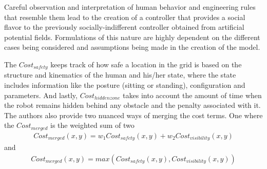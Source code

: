 \par
Careful observation and interpretation of human behavior and engineering rules that resemble them lead to the creation of a controller that provides a social flavor to the previously socially-indifferent controller obtained from artificial potential fields. Formulations of this nature are highly dependent on the different cases being considered and assumptions being made in the creation of the model.

The $Cost_{safety}$ keeps track of how safe a location in the grid is based on the structure and kinematics of the human and his/her state, where the state includes information like the posture (sitting or standing), configuration and parameters.
And lastly, $Cost_{hidden zone}$ takes into account the amount of time when the robot remains hidden behind any obstacle and the penalty associated with it. 
The authors also provide two nuanced ways of merging the cost terms. One where the $Cost_{merged}$ is the weighted sum of two
\begin{align}
Cost_{merged}(x,y) = w_{1}Cost_{safety}(x,y) + w_{2}Cost_{visibility}(x,y)
\end{align}
and 
\begin{align}
Cost_{merged}(x,y) = max(Cost_{safety}(x,y), Cost_{visibility}(x,y))
\end{align}

